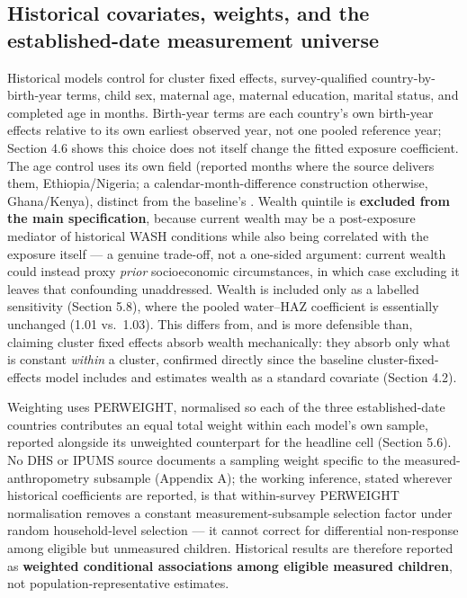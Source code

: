 \subsection{Historical covariates, weights, and the established-date measurement universe}\label{sec:3.8}

Historical models control for cluster fixed effects, survey-qualified country-by-birth-year terms, child sex, maternal age, maternal education, marital status, and completed age in months. Birth-year terms are each country's own birth-year effects relative to its own earliest observed year, not one pooled reference year; Section 4.6 shows this choice does not itself change the fitted exposure coefficient. The age control uses its own  field (reported months where the source delivers them, Ethiopia/Nigeria; a calendar-month-difference construction otherwise, Ghana/Kenya), distinct from the baseline's . Wealth quintile is \textbf{excluded from the main specification}, because current wealth may be a post-exposure mediator of historical WASH conditions while also being correlated with the exposure itself --- a genuine trade-off, not a one-sided argument: current wealth could instead proxy \emph{prior} socioeconomic circumstances, in which case excluding it leaves that confounding unaddressed. Wealth is included only as a labelled sensitivity (Section 5.8), where the pooled water--HAZ coefficient is essentially unchanged (1.01 vs.~1.03). This differs from, and is more defensible than, claiming cluster fixed effects absorb wealth mechanically: they absorb only what is constant \emph{within} a cluster, confirmed directly since the baseline cluster-fixed-effects model includes and estimates wealth as a standard covariate (Section 4.2).

Weighting uses PERWEIGHT, normalised so each of the three established-date countries contributes an equal total weight within each model's own sample, reported alongside its unweighted counterpart for the headline cell (Section 5.6). No DHS or IPUMS source documents a sampling weight specific to the measured-anthropometry subsample (Appendix A); the working inference, stated wherever historical coefficients are reported, is that within-survey PERWEIGHT normalisation removes a constant measurement-subsample selection factor under random household-level selection --- it cannot correct for differential non-response among eligible but unmeasured children. Historical results are therefore reported as \textbf{weighted conditional associations among eligible measured children}, not population-representative estimates.

